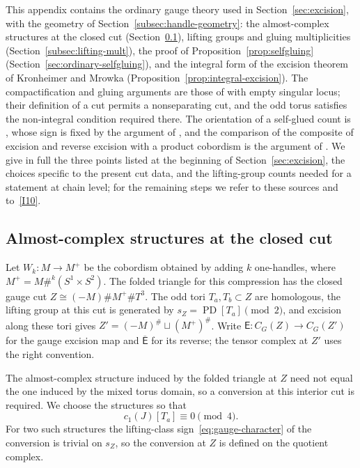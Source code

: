 \documentclass[11pt]{amsart}
\theoremstyle{definition}
\theoremstyle{remark}
\theoremstyle{plain}
\numberwithin{equation}{section}
\newcommand{\PD}{\operatorname{PD}}
\begin{document}
This appendix contains the ordinary gauge theory used in
Section~\ref{sec:excision}, with the geometry of
Section~\ref{subsec:handle-geometry}: the almost-complex structures at
the closed cut (Section~\ref{subsec:excision-structures}), lifting groups
and gluing multiplicities (Section~\ref{subsec:lifting-mult}), the proof
of Proposition~\ref{prop:selfgluing} (Section~\ref{sec:ordinary-selfgluing}),
and the integral form of the excision theorem of Kronheimer and Mrowka
(Proposition~\ref{prop:integral-excision}). The compactification and gluing
arguments are those of \cite[Section~3.9]{KM-unknot} with empty singular
locus; their definition of a cut permits a nonseparating cut, and the odd
torus satisfies the non-integral condition required there. The orientation
of a self-glued count is \cite[Proposition~5.5]{KM-unknot}, whose sign is
fixed by the argument of \cite[Lemma~2.4]{KM-sutures}, and the comparison
of the composite of excision and reverse excision with a product cobordism
is the argument of \cite[Theorem~5.6]{KM-unknot}. We give in full the three
points listed at the beginning of Section~\ref{sec:excision}, the choices
specific to the present cut data, and the lifting-group counts needed for a
statement at chain level; for the remaining steps we refer to these sources
and to~\ref{I10}.

\subsection{Almost-complex structures at the closed cut}
\label{subsec:excision-structures}
Let $W_k:M\to M^+$ be the cobordism obtained by adding $k$ one-handles,
where $M^+=M\#^k(S^1\times S^2)$. The folded triangle for this compression
has the closed gauge cut $Z\cong(-M)\#M^+\#T^3$. The odd tori
$T_a,T_b\subset Z$ are homologous, the lifting group at this cut is
generated by $s_Z=\PD[T_a]\pmod2$, and excision along these tori gives
$Z'=(-M)^\#\sqcup(M^+)^\#$. Write $\mathsf E:C_G(Z)\to C_G(Z')$ for the
gauge excision map and $\overline{\mathsf E}$ for its reverse; the tensor
complex at $Z'$ uses the right convention.

The almost-complex structure induced by the folded triangle at $Z$ need not
equal the one induced by the mixed torus domain, so a conversion at this
interior cut is required. We choose the structures so that
\begin{equation}\label{eq:cut-Chern}
 c_1(J)[T_a]\equiv0\pmod4.
\end{equation}
For two such structures the lifting-class sign~\eqref{eq:gauge-character}
of the conversion is trivial on $s_Z$, so the conversion at $Z$ is defined
on the quotient complex.
\end{document}
